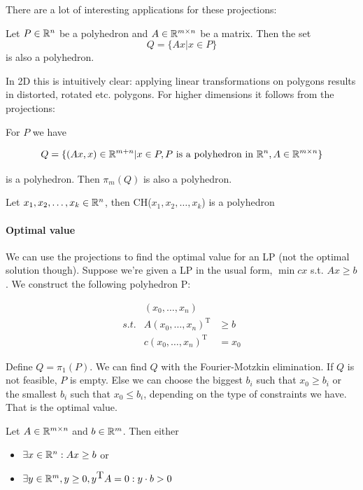 There are a lot of interesting applications for these projections:

\begin{thm}\label{Thm:linTransPoly} Let $P\in \mathbb{R}^n$ be a polyhedron and $A\in \mathbb{R}^{m\times n}$ be a matrix. Then the set
\[Q=\{Ax|x\in P\}\]
is also a polyhedron.
\end{thm}

In 2D this is intuitively clear: applying linear transformations on polygons results in distorted, rotated etc. polygons. For higher dimensions it follows from the projections:

\begin{pr} For $P$ we have

\[Q=\{(Ax,x)\in \mathbb{R}^{m+n}| x\in P, P\text{ is a polyhedron in } \mathbb{R}^{n}, A \in \mathbb{R}^{m \times n}\}\]  %

is a polyhedron. Then $\pi_m(Q)$ is also a polyhedron.
\end{pr}

\begin{cor} Let $x_1,x_2,\ldots, x_k \in \mathbb{R}^n$, then CH($x_1,x_2,\ldots, x_k$) is a polyhedron\end{cor}

\paragraph*{Optimal value} We can use the projections to find the optimal value for an LP (not the optimal solution though). Suppose we're given a LP in the usual form, $\min cx$ s.t. $Ax\geq b$. We construct the following polyhedron P:

\begin{eqnarray*}
 & (x_0,\ldots,x_n) & \\
s.t. & A(x_0,\ldots,x_n)^{\mbox{T}} & \geq b \\
& c(x_0,\ldots,x_n)^{\mbox{T}} & = x_0
\end{eqnarray*}

Define $Q = \pi_1(P)$. We can find $Q$ with the Fourier-Motzkin elimination. If $Q$ is not feasible, $P$ is empty. Else we can choose the biggest $b_i$ such that $x_0\geq b_i$ or the smallest $b_i$ such that $x_0 \leq b_i$, depending on the type of constraints we have. That is the optimal value.

\begin{thm} Let $A\in \mathbb{R}^{m\times n}$ and $b\in \mathbb{R}^m$. Then either 
\begin{itemize}
\item $\exists x\in \mathbb{R}^n: Ax\geq b$ or
\item $\exists y\in \mathbb{R}^m, y\geq 0, y^{\mbox{T}}A=0: y\cdot b>0$
\end{itemize}
\end{thm} 

